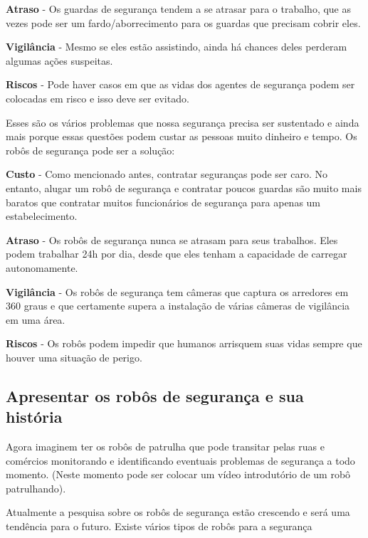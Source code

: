 \documentclass[12pt,a4paper]{article}
\begin{document}
    \textbf{Atraso} - Os guardas de segurança tendem a se atrasar para o trabalho, que as vezes pode ser um fardo/aborrecimento para os guardas que precisam cobrir eles.

    \textbf{Vigilância} - Mesmo se eles estão assistindo, ainda há chances deles perderam algumas ações suspeitas.

    \textbf{Riscos} - Pode haver casos em que as vidas dos agentes de segurança podem ser colocadas em risco e isso deve ser evitado.

    Esses são os vários problemas que nossa segurança precisa ser sustentado e ainda mais porque essas questões podem custar as pessoas muito dinheiro e tempo. Os robôs de segurança pode ser a solução:

    \textbf{Custo} - Como mencionado antes, contratar seguranças pode ser caro. No entanto, alugar um robô de segurança e contratar poucos guardas são muito mais baratos que contratar muitos funcionários de segurança para apenas um estabelecimento.

    \textbf{Atraso} - Os robôs de segurança nunca se atrasam para seus trabalhos. Eles podem trabalhar 24h por dia, desde que eles tenham a capacidade de carregar autonomamente.

    \textbf{Vigilância} - Os robôs de segurança tem câmeras que captura os arredores em 360 graus e que certamente supera a instalação de várias câmeras de vigilância em uma área.

    \textbf{Riscos} - Os robôs podem impedir que humanos arrisquem suas vidas sempre que houver uma situação de perigo.

    \subsection{Apresentar os robôs de segurança e sua história}
    Agora imaginem ter os robôs de patrulha que pode transitar pelas ruas e comércios monitorando e identificando eventuais problemas de segurança a todo momento.  (Neste momento pode ser colocar um vídeo introdutório de um robô patrulhando).

    Atualmente a pesquisa sobre os robôs de segurança estão crescendo e será uma tendência para o futuro. Existe vários tipos de robôs para a segurança

\end{document}

